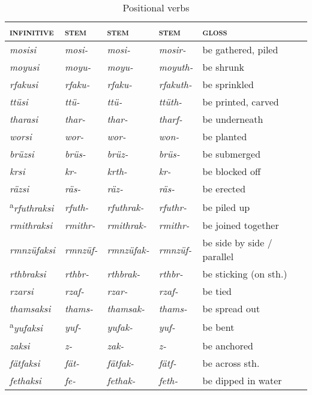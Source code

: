 \begin{table}[H]
\caption{Positional verbs}
\label{positional.verbs}
{\small%
\begin{tabular}{lllll}
	\lsptoprule
	\textsc{infinitive} & \Pos{} \textsc{stem} & \Ext{} \textsc{stem} 	& \Rs{} \textsc{stem} 	& \textsc{gloss} \\\hline
	\emph{mosisi} &\emph{mosi-} &\emph{mosi-} &\emph{mosir-} &be gathered, piled\\
	\emph{moyusi} &\emph{moyu-} &\emph{moyu-} &\emph{moyuth-} &be shrunk\\
	\emph{rfakusi} &\emph{rfaku-} &\emph{rfaku-} &\emph{rfakuth-} &be sprinkled\\
	\emph{ttüsi} &\emph{ttü-} &\emph{ttü-} &\emph{ttüth-} &be printed, carved\\
	\emph{tharasi} &\emph{thar-} &\emph{thar-} &\emph{tharf-} &be underneath\\
	\emph{worsi} &\emph{wor-} &\emph{wor-} &\emph{won-} &be planted\\\hline
	\emph{brüzsi} &\emph{brüs-} &\emph{brüz-} &\emph{brüs-} &be submerged\\
	\emph{krsi} &\emph{kr-} &\emph{krth-} &\emph{kr-} &be blocked off\\
	\emph{räzsi} &\emph{räs-} &\emph{räz-} &\emph{räs-} &be erected\\
	\textsuperscript{a}\emph{rfuthraksi} &\emph{rfuth-} &\emph{rfuthrak-} &\emph{rfuthr-} &be piled up\\
	\emph{rmithraksi} &\emph{rmithr-} &\emph{rmithrak-}	&\emph{rmithr-} &be joined together\\
	\emph{rmnzüfaksi} &\emph{rmnzüf-} &\emph{rmnzüfak-}	&\emph{rmnzüf-} &be side by side / parallel\\
	\emph{rthbraksi} &\emph{rthbr-} &\emph{rthbrak-} &\emph{rthbr-} &be sticking (on sth.)\\
	\emph{rzarsi} &\emph{rzaf-} &\emph{rzar-} &\emph{rzaf-} &be tied\\
	\emph{thamsaksi} &\emph{thams-} &\emph{thamsak-} &\emph{thams-} &be spread out\\
	\textsuperscript{a}\emph{yufaksi} &\emph{yuf-} &\emph{yufak-} &\emph{yuf-} &be bent\\
	\emph{zaksi} &\emph{z-} &\emph{zak-} &\emph{z-} &be anchored\\\hline
	\emph{fätfaksi} &\emph{fät-} &\emph{fätfak-} &\emph{fätf-} &be across sth.\\
	\emph{fethaksi} &\emph{fe-} &\emph{fethak-} &\emph{feth-} &be dipped in water\\

\end{tabular}}
\end{table}

